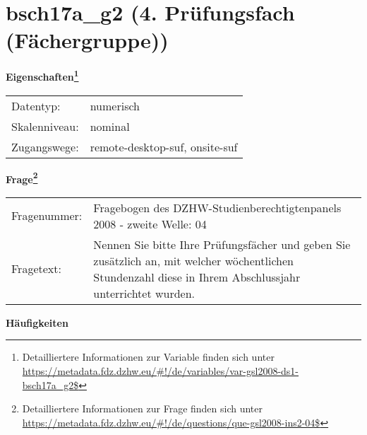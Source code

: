 
    \setcounter{footnote}{0}

    \vspace*{-1.8cm}
	\section{bsch17a\_g2 (4. Prüfungsfach (Fächergruppe))}
	\label{section:bsch17a_g2}



    \vspace*{0.5cm}
    \noindent\textbf{Eigenschaften\footnote{Detailliertere Informationen zur Variable finden sich unter
		\url{https://metadata.fdz.dzhw.eu/\#!/de/variables/var-gsl2008-ds1-bsch17a_g2$}}}\\
	\begin{tabularx}{\hsize}{@{}lX}
	Datentyp: & numerisch \\
	Skalenniveau: & nominal \\
	Zugangswege: &
	  remote-desktop-suf, 
	  onsite-suf
 \\
    \end{tabularx}



				\vspace*{0.5cm}
                \noindent\textbf{Frage\footnote{Detailliertere Informationen zur Frage finden sich unter
		              \url{https://metadata.fdz.dzhw.eu/\#!/de/questions/que-gsl2008-ins2-04$}}}\\
				\begin{tabularx}{\hsize}{@{}lX}
					Fragenummer: &
					  Fragebogen des DZHW-Studienberechtigtenpanels 2008 - zweite Welle:
					  04
 \\
					Fragetext: & Nennen Sie bitte Ihre Prüfungsfächer und geben Sie zusätzlich an, mit welcher wöchentlichen Stundenzahl diese in Ihrem Abschlussjahr unterrichtet wurden. \\
				\end{tabularx}





        		\vspace*{0.5cm}
                \noindent\textbf{Häufigkeiten}

